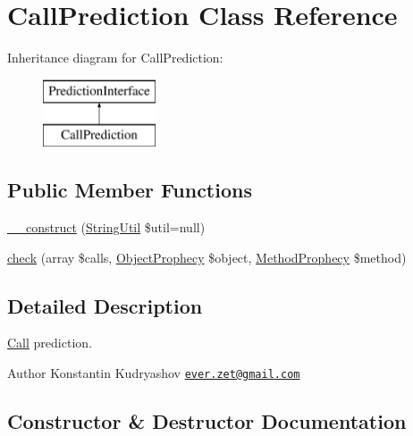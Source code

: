 \hypertarget{class_prophecy_1_1_prediction_1_1_call_prediction}{}\section{Call\+Prediction Class Reference}
\label{class_prophecy_1_1_prediction_1_1_call_prediction}
Inheritance diagram for Call\+Prediction\+:\begin{figure}[H]
\begin{center}
\leavevmode
\includegraphics[height=2.000000cm]{class_prophecy_1_1_prediction_1_1_call_prediction}
\end{center}
\end{figure}
\subsection*{Public Member Functions}
\begin{DoxyCompactItemize}
\item 
\mbox{\hyperlink{class_prophecy_1_1_prediction_1_1_call_prediction_a957995a2f5cd98ebb4093190b136df61}{\+\_\+\+\_\+construct}} (\mbox{\hyperlink{class_prophecy_1_1_util_1_1_string_util}{String\+Util}} \$util=null)
\item 
\mbox{\hyperlink{class_prophecy_1_1_prediction_1_1_call_prediction_a8753cea9fc952add136830abab587633}{check}} (array \$calls, \mbox{\hyperlink{class_prophecy_1_1_prophecy_1_1_object_prophecy}{Object\+Prophecy}} \$object, \mbox{\hyperlink{class_prophecy_1_1_prophecy_1_1_method_prophecy}{Method\+Prophecy}} \$method)
\end{DoxyCompactItemize}


\subsection{Detailed Description}
\mbox{\hyperlink{namespace_prophecy_1_1_call}{Call}} prediction.

\begin{DoxyAuthor}{Author}
Konstantin Kudryashov \href{mailto:ever.zet@gmail.com}{\tt ever.\+zet@gmail.\+com} 
\end{DoxyAuthor}


\subsection{Constructor \& Destructor Documentation}
\mbox{\label{class_prophecy_1_1_prediction_1_1_call_prediction_a957995a2f5cd98ebb4093190b136df61}} 
